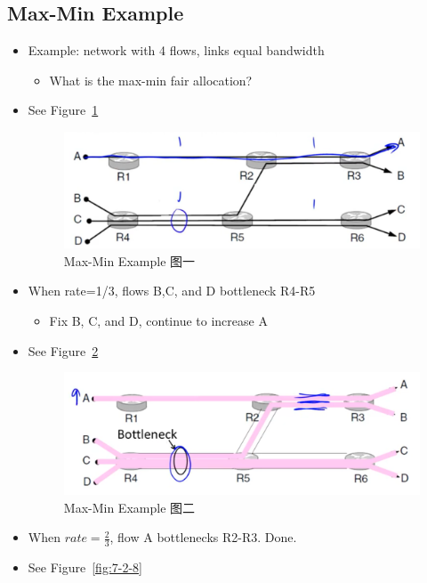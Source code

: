 \documentclass[12pt]{ctexart}   %
\begin{document}
	\subsection{Max-Min Example}
	\begin{itemize}
		\item Example: network with 4 flows, links equal bandwidth
		\begin{itemize}
			\item What is the max-min fair allocation?
		\end{itemize}
		\item See Figure~\ref{fig:7-2-6}
		  
		 \begin{figure}[h!] %
		\centering
		 \includegraphics[scale=0.7]{images/7-2-6}
		\caption{ Max-Min Example 图一}
		 \label{fig:7-2-6}
		 \end{figure}
		 
		 \item When rate=1/3, flows B,C, and D bottleneck R4-R5
		 \begin{itemize}
		 	\item Fix B, C, and D, continue to increase A
		 \end{itemize}
		 \item See Figure~\ref{fig:7-2-7}
		  
		 \begin{figure}[h!] %
		\centering
		 \includegraphics[scale=0.7]{images/7-2-7}
		\caption{ Max-Min Example 图二 }
		 \label{fig:7-2-7}
		 \end{figure}
		 
		 \item When $rate = \frac{2}{3}$, flow A bottlenecks R2-R3. Done.
		 \item See Figure~\ref{fig:7-2-8}
		  

\end{itemize}
\end{document}

